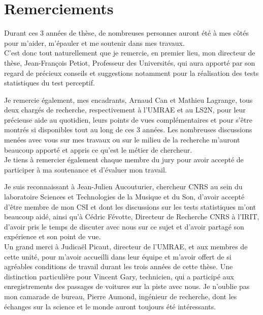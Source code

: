 \chapter*{Remerciements}


Durant ces 3 années de thèse, de nombreuses personnes auront été à mes côtés pour m'aider, m'épauler et me soutenir dans mes travaux. \\

C'est donc tout naturellement que je remercie, en premier lieu, mon directeur de thèse, Jean-François Petiot, Professeur des Universités, qui aura apporté par son regard de précieux conseils et suggestions notamment pour la réalisation des tests statistiques du test perceptif.

Je remercie également, mes encadrants, Arnaud Can et Mathieu Lagrange, tous deux chargés de recherche, respectivement à l'UMRAE et au LS2N, pour leur précieuse aide au quotidien, leurs points de vues complémentaires et pour s'être montrés si disponibles tout au long de ces 3 années. Les nombreuses discussions menées avec vous sur mes travaux ou sur le milieu de la recherche m'auront beaucoup apporté et appris ce qu'est le métier de chercheur. \\

Je tiens à remercier également chaque membre du jury pour avoir accepté de participer à ma soutenance et d'évaluer mon travail.

Je suis reconnaissant à Jean-Julien Aucouturier, chercheur CNRS au sein du laboratoire Sciences et Technologies de la Musique et du Son, d'avoir accepté d'être membre de mon CSI et dont les discussions sur les tests statistiques m'ont beaucoup aidé, ainsi qu'à Cédric Févotte, Directeur de Recherche CNRS à l'IRIT, d'avoir pris le temps de discuter avec nous sur ce sujet et d'avoir partagé son expérience et son point de vue. \\

Un grand merci à Judicaël Picaut, directeur de l'UMRAE, et aux membres de cette unité, pour m'avoir accueilli dans leur équipe et m'avoir offert de si agréables conditions de travail durant les trois années de cette thèse. Une distinction particulière pour Vincent Gary, technicien, qui a participé aux enregistrements des passages de voitures sur la piste avec nous. Je n'oublie pas mon camarade de bureau, Pierre Aumond, ingénieur de recherche, dont les échanges sur la science et le monde auront toujours été intéressants. \\

